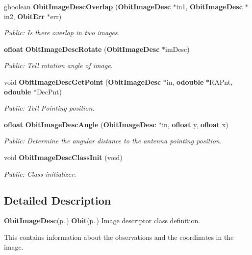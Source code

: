 \begin{CompactItemize}
gboolean {\bf Obit\-Image\-Desc\-Overlap} ({\bf Obit\-Image\-Desc} $\ast$in1, {\bf Obit\-Image\-Desc} $\ast$in2, {\bf Obit\-Err} $\ast$err)
\begin{CompactList}\small\item\em Public: Is there overlap in two images. \item\end{CompactList}\item 
{\bf ofloat} {\bf Obit\-Image\-Desc\-Rotate} ({\bf Obit\-Image\-Desc} $\ast$im\-Desc)
\begin{CompactList}\small\item\em Public: Tell rotation angle of image. \item\end{CompactList}\item 
void {\bf Obit\-Image\-Desc\-Get\-Point} ({\bf Obit\-Image\-Desc} $\ast$in, {\bf odouble} $\ast$RAPnt, {\bf odouble} $\ast$Dec\-Pnt)
\begin{CompactList}\small\item\em Public: Tell Pointing position. \item\end{CompactList}\item 
{\bf ofloat} {\bf Obit\-Image\-Desc\-Angle} ({\bf Obit\-Image\-Desc} $\ast$in, {\bf ofloat} y, {\bf ofloat} x)
\begin{CompactList}\small\item\em Public: Determine the angular distance to the antenna pointing position. \item\end{CompactList}\item 
void {\bf Obit\-Image\-Desc\-Class\-Init} (void)
\begin{CompactList}\small\item\em Public: Class initializer. \item\end{CompactList}\end{CompactItemize}


\subsection{Detailed Description}
{\bf Obit\-Image\-Desc}{\rm (p.\,\pageref{structObitImageDesc})} {\bf Obit}{\rm (p.\,\pageref{structObit})} Image descriptor class definition. 

This contains information about the observations and the coordinates in the image.


